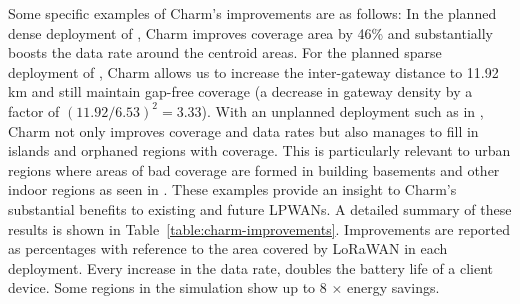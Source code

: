 Some specific examples of Charm's improvements are as follows: In the planned
dense deployment of , Charm improves coverage area
by 46\% and substantially boosts the data rate around the centroid areas. For
the planned sparse deployment of , Charm allows us
to increase the inter-gateway distance to 11.92 km and still maintain gap-free
coverage (a decrease in gateway density by a factor of $(11.92/6.53)^2=3.33$).
With an unplanned deployment such as in , Charm not
only improves coverage and data rates but also manages to fill in islands and
orphaned regions with coverage. This is particularly relevant to urban regions
where areas of bad coverage are formed in building basements and other indoor
regions as seen in . These examples provide an
insight to Charm's substantial benefits to existing and future LPWANs. A
detailed summary of these results is shown in
Table~\ref{table:charm-improvements}. Improvements are reported as percentages
with reference to the area covered by LoRaWAN in each deployment. Every
increase in the data rate, doubles the battery life of a client device. Some
regions in the simulation show up to 8 $\times$ energy savings.


